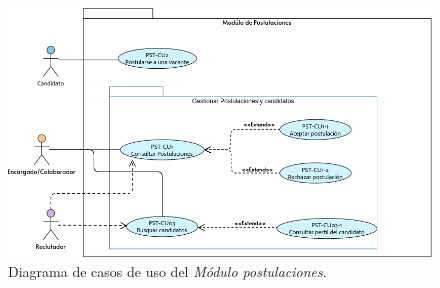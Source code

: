	\begin{figure}[hbtp!]
		\begin{center}
			\includegraphics[width=1 \textwidth]{anexos/imagenes/CUPST.png}
		\end{center}
		
		\caption{Diagrama de casos de uso del \textit{Módulo postulaciones}.}
		\label{adcu:pst}
	\end{figure}

	
	

	
	